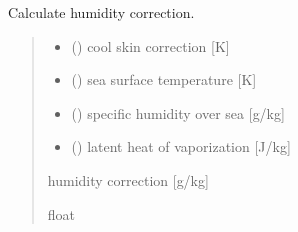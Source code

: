 \documentclass[letterpaper,10pt,english]{sphinxmanual}
\begin{document}

\begin{fulllineitems}
\label{\detokenize{users_guide:AirSeaFluxCode.cs_wl_subs.get_dqer}}
\pysigstartsignatures
{}
\pysigstopsignatures
\sphinxAtStartPar
Calculate humidity correction.
\begin{quote}\begin{description}
\begin{itemize}
\item {} 
\sphinxAtStartPar
{} () \textendash{} cool skin correction         {[}K{]}

\item {} 
\sphinxAtStartPar
{} () \textendash{} sea surface temperature      {[}K{]}

\item {} 
\sphinxAtStartPar
{} () \textendash{} specific humidity over sea   {[}g/kg{]}

\item {} 
\sphinxAtStartPar
{} () \textendash{} latent heat of vaporization   {[}J/kg{]}

\end{itemize}

\sphinxAtStartPar
{} \textendash{} humidity correction            {[}g/kg{]}

\sphinxAtStartPar
float

\end{description}\end{quote}

\end{fulllineitems}

\end{document}
